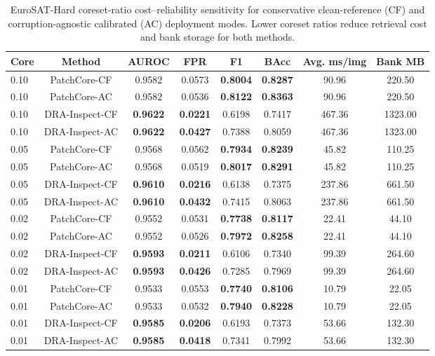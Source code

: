 \documentclass[remotesensing,article,submit,pdftex,moreauthors]{Definitions/mdpi}
\begin{document}
\begin{table}[!htbp]
\caption{EuroSAT-Hard coreset-ratio cost--reliability sensitivity for conservative clean-reference (CF) and corruption-agnostic calibrated (AC) deployment modes. Lower coreset ratios reduce retrieval cost and bank storage for both methods.}
\label{tab:eurosat-hard-coreset-tradeoff}
\centering
\scriptsize
\setlength{\tabcolsep}{3pt}
\begin{tabular}{lccccccc}
\hline
Core & Method & AUROC & FPR & F1 & BAcc & Avg. ms/img & Bank MB \\
\hline
0.10 & PatchCore-CF & 0.9582 & 0.0573 & \textbf{0.8004} & \textbf{0.8287} & 90.96 & 220.50 \\
0.10 & PatchCore-AC & 0.9582 & 0.0536 & \textbf{0.8122} & \textbf{0.8363} & 90.96 & 220.50 \\
0.10 & DRA-Inspect-CF & \textbf{0.9622} & \textbf{0.0221} & 0.6198 & 0.7417 & 467.36 & 1323.00 \\
0.10 & DRA-Inspect-AC & \textbf{0.9622} & \textbf{0.0427} & 0.7388 & 0.8059 & 467.36 & 1323.00 \\
0.05 & PatchCore-CF & 0.9568 & 0.0562 & \textbf{0.7934} & \textbf{0.8239} & 45.82 & 110.25 \\
0.05 & PatchCore-AC & 0.9568 & 0.0519 & \textbf{0.8017} & \textbf{0.8291} & 45.82 & 110.25 \\
0.05 & DRA-Inspect-CF & \textbf{0.9610} & \textbf{0.0216} & 0.6138 & 0.7375 & 237.86 & 661.50 \\
0.05 & DRA-Inspect-AC & \textbf{0.9610} & \textbf{0.0432} & 0.7415 & 0.8063 & 237.86 & 661.50 \\
0.02 & PatchCore-CF & 0.9552 & 0.0531 & \textbf{0.7738} & \textbf{0.8117} & 22.41 & 44.10 \\
0.02 & PatchCore-AC & 0.9552 & 0.0526 & \textbf{0.7972} & \textbf{0.8258} & 22.41 & 44.10 \\
0.02 & DRA-Inspect-CF & \textbf{0.9593} & \textbf{0.0211} & 0.6106 & 0.7340 & 99.39 & 264.60 \\
0.02 & DRA-Inspect-AC & \textbf{0.9593} & \textbf{0.0426} & 0.7285 & 0.7969 & 99.39 & 264.60 \\
0.01 & PatchCore-CF & 0.9533 & 0.0553 & \textbf{0.7740} & \textbf{0.8106} & 10.79 & 22.05 \\
0.01 & PatchCore-AC & 0.9533 & 0.0532 & \textbf{0.7940} & \textbf{0.8228} & 10.79 & 22.05 \\
0.01 & DRA-Inspect-CF & \textbf{0.9585} & \textbf{0.0206} & 0.6193 & 0.7373 & 53.66 & 132.30 \\
0.01 & DRA-Inspect-AC & \textbf{0.9585} & \textbf{0.0418} & 0.7341 & 0.7992 & 53.66 & 132.30 \\
\hline
\end{tabular}
\end{table}
\end{document}
